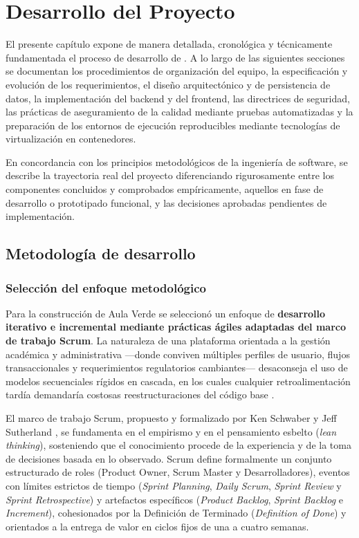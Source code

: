 \chapter{Desarrollo del Proyecto}
\label{cap:desarrollo}

El presente capítulo expone de manera detallada, cronológica y técnicamente fundamentada el proceso de desarrollo de . A lo largo de las siguientes secciones se documentan los procedimientos de organización del equipo, la especificación y evolución de los requerimientos, el diseño arquitectónico y de persistencia de datos, la implementación del backend y del frontend, las directrices de seguridad, las prácticas de aseguramiento de la calidad mediante pruebas automatizadas y la preparación de los entornos de ejecución reproducibles mediante tecnologías de virtualización en contenedores.

En concordancia con los principios metodológicos de la ingeniería de software, se describe la trayectoria real del proyecto diferenciando rigurosamente entre los componentes concluidos y comprobados empíricamente, aquellos en fase de desarrollo o prototipado funcional, y las decisiones aprobadas pendientes de implementación.

\section{Metodología de desarrollo}
\label{sec:metodologia}

\subsection{Selección del enfoque metodológico}
\label{sec:seleccion_metodologica}

Para la construcción de Aula Verde se seleccionó un enfoque de \textbf{desarrollo iterativo e incremental mediante prácticas ágiles adaptadas del marco de trabajo Scrum}. La naturaleza de una plataforma orientada a la gestión académica y administrativa —donde conviven múltiples perfiles de usuario, flujos transaccionales y requerimientos regulatorios cambiantes— desaconseja el uso de modelos secuenciales rígidos en cascada, en los cuales cualquier retroalimentación tardía demandaría costosas reestructuraciones del código base \cite{sommerville2011software}.

El marco de trabajo Scrum, propuesto y formalizado por Ken Schwaber y Jeff Sutherland \cite{schwaber2020scrum}, se fundamenta en el empirismo y en el pensamiento esbelto (\textit{lean thinking}), sosteniendo que el conocimiento procede de la experiencia y de la toma de decisiones basada en lo observado. Scrum define formalmente un conjunto estructurado de roles (Product Owner, Scrum Master y Desarrolladores), eventos con límites estrictos de tiempo (\textit{Sprint Planning}, \textit{Daily Scrum}, \textit{Sprint Review} y \textit{Sprint Retrospective}) y artefactos específicos (\textit{Product Backlog}, \textit{Sprint Backlog} e \textit{Increment}), cohesionados por la Definición de Terminado (\textit{Definition of Done}) y orientados a la entrega de valor en ciclos fijos de una a cuatro semanas.


